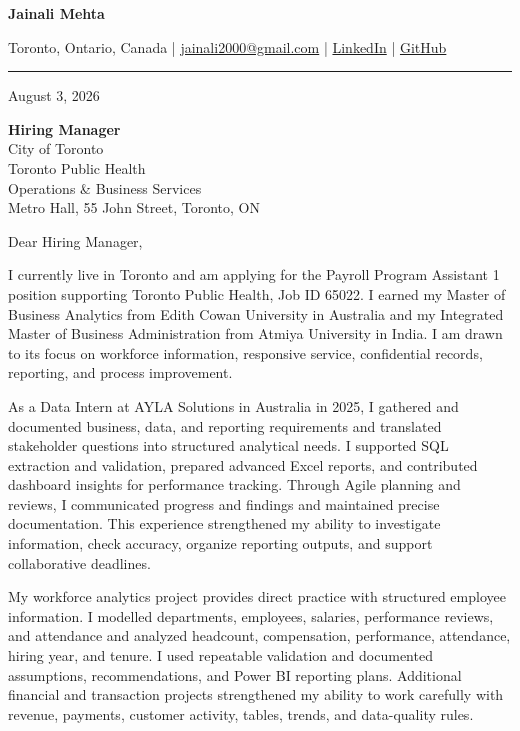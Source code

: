 \documentclass[letterpaper,10pt]{article}
\begin{document}
\begin{center}
  {\fontsize{17}{19}\selectfont\textbf{Jainali Mehta}}\par\vspace{2pt}
  \small Toronto, Ontario, Canada \;|\;
  \href{mailto:jainali2000@gmail.com}{jainali2000@gmail.com} \;|\;
  \href{https://www.linkedin.com/in/jainali-mehta}{LinkedIn} \;|\;
  \href{https://github.com/jainalimehta}{GitHub}
\end{center}
\vspace{-5pt}
\noindent\rule{\textwidth}{0.4pt}

August 3, 2026

\textbf{Hiring Manager}\\
City of Toronto\\
Toronto Public Health\\
Operations \& Business Services\\
Metro Hall, 55 John Street, Toronto, ON

Dear Hiring Manager,

I currently live in Toronto and am applying for the Payroll Program Assistant 1 position supporting Toronto Public Health, Job ID 65022. I earned my Master of Business Analytics from Edith Cowan University in Australia and my Integrated Master of Business Administration from Atmiya University in India. I am drawn to its focus on workforce information, responsive service, confidential records, reporting, and process improvement.

As a Data Intern at AYLA Solutions in Australia in 2025, I gathered and documented business, data, and reporting requirements and translated stakeholder questions into structured analytical needs. I supported SQL extraction and validation, prepared advanced Excel reports, and contributed dashboard insights for performance tracking. Through Agile planning and reviews, I communicated progress and findings and maintained precise documentation. This experience strengthened my ability to investigate information, check accuracy, organize reporting outputs, and support collaborative deadlines.

My workforce analytics project provides direct practice with structured employee information. I modelled departments, employees, salaries, performance reviews, and attendance and analyzed headcount, compensation, performance, attendance, hiring year, and tenure. I used repeatable validation and documented assumptions, recommendations, and Power BI reporting plans. Additional financial and transaction projects strengthened my ability to work carefully with revenue, payments, customer activity, tables, trends, and data-quality rules.
\end{document}
